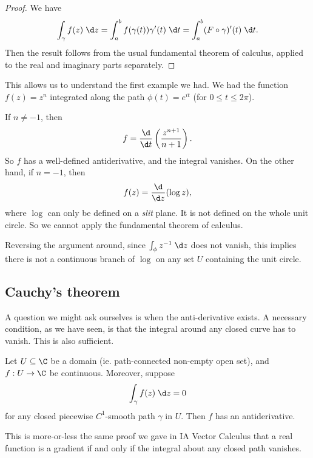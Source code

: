 \documentclass[a4paper]{article}
\begin{document}
\begin{proof}
  We have
  \[
    \int_\gamma f(z)\;\d z = \int_a^b f(\gamma(t)) \gamma'(t) \;\d t = \int_a^b (F \circ \gamma)' (t)\;\d t.
  \]
  Then the result follows from the usual fundamental theorem of calculus, applied to the real and imaginary parts separately.
\end{proof}

\begin{eg}
  This allows us to understand the first example we had. We had the function $f(z) = z^n$ integrated along the path $\phi(t) = e^{it}$ (for $0 \leq t \leq 2\pi$).

  If $n \not= -1$, then
  \[
    f = \frac{\d}{\d t}\left(\frac{z^{n + 1}}{n + 1}\right).
  \]
  So $f$ has a well-defined antiderivative, and the integral vanishes. On the other hand, if $n = -1$, then
  \[
    f(z) = \frac{\d}{\d z} (\log z),
  \]
  where $\log$ can only be defined on a \emph{slit} plane. It is not defined on the whole unit circle. So we cannot apply the fundamental theorem of calculus.

  Reversing the argument around, since $\int_\phi z^{-1} \;\d z$ does not vanish, this implies there is not a continuous branch of $\log$ on any set $U$ containing the unit circle.
\end{eg}

\subsection{Cauchy's theorem}
A question we might ask ourselves is when the anti-derivative exists. A necessary condition, as we have seen, is that the integral around any closed curve has to vanish. This is also sufficient.
\begin{prop}
  Let $U \subseteq \C$ be a domain (ie. path-connected non-empty open set), and $f: U \to \C$ be continuous. Moreover, suppose
  \[
    \int_\gamma f(z)\;\d z = 0
  \]
  for any closed piecewise $C^1$-smooth path $\gamma$ in $U$. Then $f$ has an antiderivative.
\end{prop}

This is more-or-less the same proof we gave in IA Vector Calculus that a real function is a gradient if and only if the integral about any closed path vanishes.
\end{document}
